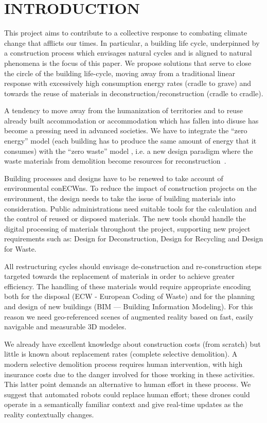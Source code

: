 \section{\uppercase{Introduction}}
\label{sec:introduction}


This project aims to contribute to a collective response to combating climate change that afflicts our times. In particular, a building life cycle, underpinned by a construction process which envisages natural cycles and is aligned to natural phenomena is the focus of this paper. We propose solutions that serve to close the circle of the building life-cycle, moving away from a traditional linear response with excessively high consumption energy rates (cradle to grave) and towards the reuse of materials in deconstruction/reconstruction (cradle to cradle).

A tendency to move away from the humanization of territories and to reuse already  built accommodation or accommodation which has fallen into disuse has become a pressing need in advanced societies. We have to integrate the ``zero energy'' model (each building has to produce the same amount of energy that it consumes) with the ``zero waste'' model , i.e. a new design paradigm where the waste materials from demolition become resources for reconstruction~\cite{altamura:12}.

Building processes and designs have to be renewed to take account of environmental conECWns. To reduce the impact of construction projects on the environment, the design needs to take the issue of building materials into consideration. Public administrations need suitable tools for the calculation and the control of reused or disposed materials. The new tools should handle the digital processing of materials throughout the project, supporting new project requirements such as: Design for Deconstruction, Design for Recycling and Design for Waste.

All restructuring cycles should envisage de-construction and re-construction steps targeted towards the replacement of materials in order to achieve greater efficiency. The handling of these materials would require appropriate encoding both for the disposal (ECW - European Coding of Waste) and for the planning and design of new buildings (BIM --- Building Information Modeling). For this reason we need geo-referenced scenes of augmented reality based on fast, easily navigable and measurable 3D modeles. 

We already have excellent knowledge about construction costs (from scratch) but little is known about replacement rates (complete selective demolition). A modern selective demolition process requires human intervention, with high insurance costs due to the danger involved for those working in these activities. This latter point demands an alternative to human effort in these process. We suggest that automated robots could replace human effort; these drones could operate in a semantically familiar context and give real-time updates as the reality contextually changes. 


